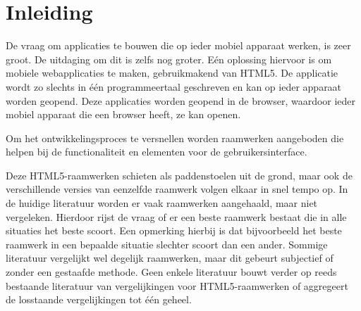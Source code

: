 \chapter{Inleiding} %
\label{inleiding}

De vraag om applicaties te bouwen die op ieder mobiel apparaat werken, is zeer groot.
De uitdaging om dit is zelfs nog groter.
Eén oplossing hiervoor is om mobiele webapplicaties te maken, gebruikmakend van HTML5.
De applicatie wordt zo slechts in één programmeertaal geschreven en kan op ieder apparaat  worden geopend.
Deze applicaties worden geopend in de browser, waardoor ieder mobiel apparaat die een browser heeft, ze kan openen.

Om het ontwikkelingsproces te versnellen worden raamwerken aangeboden die helpen bij de functionaliteit en elementen voor de gebruikersinterface. 

Deze HTML5-raamwerken schieten als paddenstoelen uit de grond, maar ook de verschillende versies van eenzelfde raamwerk volgen elkaar in snel tempo op.
In de huidige literatuur worden er vaak raamwerken aangehaald, maar niet vergeleken.
Hierdoor rijst de vraag of er een beste raamwerk bestaat die in alle situaties het beste scoort.
Een opmerking hierbij is dat bijvoorbeeld het beste raamwerk in een bepaalde situatie slechter scoort dan een ander.
Sommige literatuur vergelijkt wel degelijk raamwerken, maar dit gebeurt subjectief of zonder een gestaafde methode.
Geen enkele literatuur bouwt verder op reeds bestaande literatuur van vergelijkingen voor HTML5-raamwerken of aggregeert de losstaande vergelijkingen tot één geheel.

